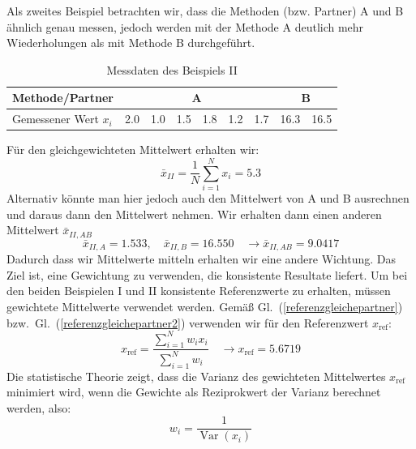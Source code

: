  Als zweites Beispiel betrachten wir, dass die Methoden (bzw. Partner) A und B ähnlich
 genau messen, jedoch werden mit der Methode A deutlich mehr Wiederholungen
 als mit Methode B durchgeführt. 
 
 \begin{table}[!htb]
 	\caption{Messdaten des Beispiels II}
 	\begin{center}
 		\begin{tabular}{l| rrrrrr |rr}
 			\hline 
 			Methode/Partner & \multicolumn{6}{c}{A} \vline & \multicolumn{2}{c}{B} \\ \hline
 			Gemessener Wert $x_i$ & 2.0 & 1.0 & 1.5 & 1.8 & 1.2 & 1.7 
 			& 16.3 & 16.5\\ \hline
 		\end{tabular}
 	\end{center}
 	\label{tab:Beispiel_II}
 \end{table}
 Für den gleichgewichteten Mittelwert erhalten wir:
 \begin{equation}
 \bar x_{II} = \frac{1}{N} \sum_{i=1}^N x_i = 5.3
 \end{equation}
 Alternativ könnte man hier jedoch auch den Mittelwert von A und B 
 ausrechnen und daraus dann den Mittelwert nehmen. Wir erhalten dann einen anderen Mittelwert $\bar x_{II,AB}$
 \begin{equation}
 \bar x_{II,A} = 1.533, \quad \bar x_{II,B} = 16.550 \quad \rightarrow
 \bar x_{II,AB} = 9.0417
 \label{eq:Mittelwerte_x_II_A_B}
 \end{equation}
 Dadurch dass wir Mittelwerte mitteln erhalten wir eine andere Wichtung. Das
 Ziel ist, eine Gewichtung zu verwenden, die konsistente Resultate liefert.
 Um bei den beiden Beispielen I und II konsistente Referenzwerte zu erhalten, 
 müssen gewichtete Mittelwerte verwendet werden. Gemäß Gl.~(\ref{referenzgleichepartner})
 bzw.\ Gl.~(\ref{referenzgleichepartner2}) verwenden wir für den Referenzwert $x_\mathrm{ref}$:
 \begin{equation}
 x_\mathrm{ref} = \frac{\sum\limits_{i=1}^N w_i x_i}{\sum\limits_{i=1}^N w_i} \quad \rightarrow 
 x_\mathrm{ref} =  5.6719
 \label{eq:Referenzwert_konsistent}
 \end{equation}
Die statistische Theorie zeigt, dass die Varianz des gewichteten Mittelwertes $x_\mathrm{ref}$ minimiert wird,
wenn die Gewichte als Reziprokwert der Varianz berechnet werden, also: 
\begin{equation}
    w_i = \frac{1}{\operatorname{Var}(x_i)}
\end{equation}  

